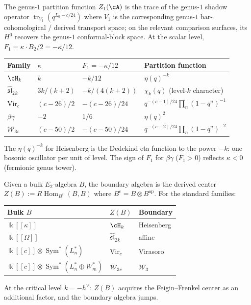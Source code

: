 \begin{computation}
The genus-$1$ partition function $Z_1(\cA)$
is the trace of the genus-$1$ shadow operator
$\operatorname{tr}_{V_1}(q^{L_0-c/24})$ where
$V_1$ is the corresponding genus-$1$ bar-cohomological /
derived transport space; on the relevant comparison surfaces,
its $H^0$ recovers the genus-$1$ conformal-block space.
At the scalar level, $F_1=\kappa\cdot B_2/2=-\kappa/12$.
\begin{center}
\renewcommand{\arraystretch}{1.2}
\begin{tabular}{llll}
\textbf{Family} & $\kappa$ & $F_1=-\kappa/12$
 & \textbf{Partition function} \\
\hline
$\cH_k$ & $k$ & $-k/12$
 & $\eta(q)^{-k}$ \\
$\widehat{\mathfrak{sl}}_2{}_k$
 & $3k/(k{+}2)$ & $-k/(4(k{+}2))$
 & $\chi_k(q)$ (level-$k$ character) \\
$\mathrm{Vir}_c$ & $(c{-}26)/2$ & $-(c{-}26)/24$
 & $q^{-(c-1)/24}\prod_n(1-q^n)^{-1}$ \\
$\beta\gamma$ & $-2$ & $1/6$
 & $\eta(q)^2$ \\
$\mathcal W_3{}_c$ & $(c{-}50)/2$ & $-(c{-}50)/24$
 & $q^{-(c-2)/24}\prod_n(1-q^n)^{-2}$
\end{tabular}
\end{center}
The $\eta(q)^{-k}$ for Heisenberg is the Dedekind eta
function to the power $-k$: one bosonic oscillator per unit
of level. The sign of $F_1$ for $\beta\gamma$ ($F_1>0$)
reflects $\kappa<0$ (fermionic genus tower).
\end{computation}

\begin{construction}
Given a bulk $E_2$-algebra $B$, the boundary algebra is the
derived center
$Z(B):=R\!\operatorname{Hom}_{B^e}(B,B)$
where $B^e=B\otimes B^{\mathrm{op}}$. For the standard families:
\begin{center}
\renewcommand{\arraystretch}{1.15}
\begin{tabular}{lll}
\textbf{Bulk $B$} & \textbf{$Z(B)$} & \textbf{Boundary} \\
\hline
$\Bbbk[[\kappa]]$ & $\cH_k$ & Heisenberg \\
$\Bbbk[[\Omega]]$ & $\widehat{\mathfrak{sl}}_2{}_k$ & affine \\
$\Bbbk[[c]]\otimes\operatorname{Sym}^*(L_n^*)$
 & $\mathrm{Vir}_c$ & Virasoro \\
$\Bbbk[[c]]\otimes\operatorname{Sym}^*(L_n^*\oplus W_m^*)$
 & $\mathcal W_3{}_c$ & $\mathcal W_3$
\end{tabular}
\end{center}
At the critical level $k=-h^\vee$: $Z(B)$ acquires the
Feigin--Frenkel center as an additional factor, and the
boundary algebra jumps.
\end{construction}

